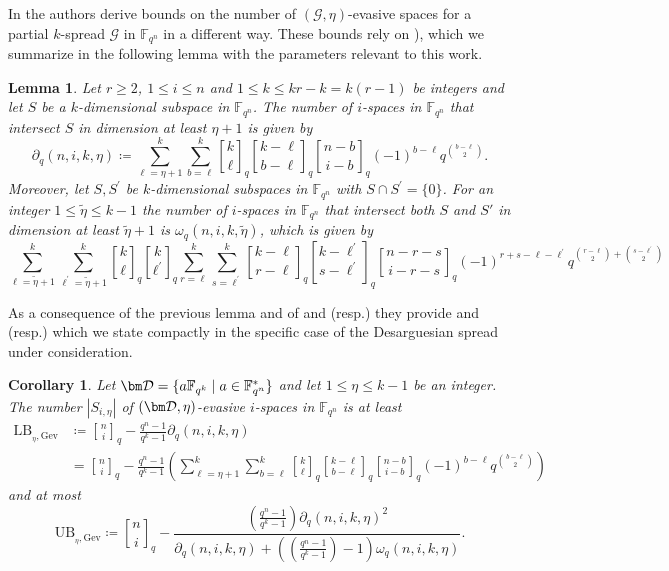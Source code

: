 \documentclass{article}
\newtheorem{lemma}{Lemma}
\newtheorem{corollary}{Corollary}
\newcommand{\Fqn}{\mathbb{F}_{q^n}}
\newcommand{\Fqk}{\mathbb{F}_{q^k}}
\newcommand{\calD}{\mathcal{D}}
\newcommand{\calG}{\mathcal{G}}
\newcommand{\gbinom}[2]{\genfrac{[}{]}{0pt}{}{#1}{#2}}
\begin{document}
    In \cite{gruica2024generalised} the authors derive bounds on the number of $(\calG,\eta)$-evasive spaces for a partial $k$-spread $\calG$ in $\Fqn$ in a different way. These bounds rely on \cite[Lemma 5.11, Lemma 5.12]{gruica2024generalised}), which we summarize in the following lemma with the parameters relevant to this work.
\begin{lemma}{\cite{gruica2024generalised}}
    Let $r\geq 2$, $1 \leq i \leq n$ and $1 \leq k \leq kr-k=k(r-1)$ be integers and let $S$ be a $k$-dimensional subspace in $\Fqn$.
    \noindent The number of $i$-spaces in $\Fqn$ that intersect $S$ in dimension at least $\eta+1$ is given by
    \[
    \partial_q(n,i,k,\eta) \coloneqq \sum_{\ell=\eta+1}^{k} \sum_{b=\ell}^{k} \gbinom{k}{\ell}_q \gbinom{k-\ell}{b-\ell}_q \gbinom{n-b}{i-b}_q (-1)^{b-\ell} q^{\binom{b-\ell}{2}}.
\]
Moreover, let $S,S^\prime$ be $k$-dimensional subspaces in $\Fqn$ with $S\cap S^\prime=\{0\}$. For an integer $1\leq\tilde{\eta}\leq k-1$ the number of $i$-spaces in $\Fqn$ that intersect both $S$ and $S'$ in dimension at least $\tilde{\eta}+1$ is $\omega_q(n,i,k,\tilde{\eta})$, which is given by
\[
\sum_{\ell=\tilde{\eta}+1}^{k} \sum_{\ell^{\prime}=\tilde{\eta}+1}^{k} \gbinom{k}{\ell}_q \gbinom{k}{\ell^{\prime}}_q \sum_{r=\ell}^{k} \sum_{s=\ell^{\prime}}^{k} \gbinom{k-\ell}{r-\ell}_q \gbinom{k-\ell^{\prime}}{s-\ell^{\prime}}_q
\gbinom{n-r-s}{i-r-s}_q (-1)^{r+s-\ell-\ell^{\prime}} q^{\binom{r-\ell}{2} + \binom{s-\ell^{\prime}}{2}}
\]
\end{lemma}
As a consequence of the previous lemma and of \cite[Lemma 5.8]{gruica2024generalised} and \cite[Lemma 5.9]{gruica2024generalised} (resp.) they provide \cite[Corollary 5.14]{gruica2024generalised} and \cite[Corollary 5.18]{gruica2024generalised} (resp.) which we state compactly in the specific case of the Desarguesian spread under consideration.
\begin{corollary}{\cite{gruica2024generalised}}
    Let $\bm \calD= \{ a \Fqk \mid a \in \Fqn^* \}$ and let $1 \leq \eta \leq k-1$ be an integer. The number $\left\lvert S_{i,\eta}\right\rvert$ of $(\bm \calD, \eta)$-evasive $i$-spaces in $\Fqn$ is at least
    \begin{align*}
        \mathrm{LB}_{_{\eta},\mathrm{Gev}}&\coloneqq\gbinom{n}{i}_q - \frac{q^n-1}{q^k-1} \partial_q(n,i,k,\eta)\\
        &=\gbinom{n}{i}_q - \frac{q^n-1}{q^k-1}\left(\sum_{\ell=\eta+1}^{k} \sum_{b=\ell}^{k} \gbinom{k}{\ell}_q \gbinom{k-\ell}{b-\ell}_q \gbinom{n-b}{i-b}_q (-1)^{b-\ell} q^{\binom{b-\ell}{2}}\right)
    \end{align*}
    and at most
\[
\mathrm{UB}_{_{\eta},\mathrm{Gev}}\coloneqq\gbinom{n}{i}_q - \frac{\left(\frac{q^n-1}{q^k-1}\right) \partial_q(n,i,k,\eta)^2}{\partial_q(n,i,k,\eta) + \left(\left(\frac{q^n-1}{q^k-1}\right)-1\right) \omega_q(n,i,k,\eta)}.
\]
\end{corollary}
\end{document}
